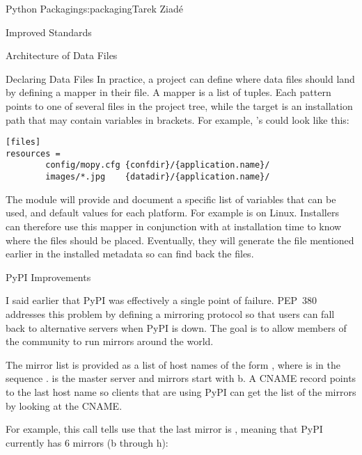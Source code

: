 \begin{aosachapter}{Python Packaging}{s:packaging}{Tarek Ziad\'{e}}
\begin{aosasect1}{Improved Standards}
\begin{aosasect2}{Architecture of Data Files}
\begin{aosasect3}{Declaring Data Files}
In practice, a project can define where data files should land by
defining a mapper in their  file.  A mapper is a
list of  tuples. Each pattern
points to one of several files in the project tree, while the target
is an installation path that may contain variables in brackets.  For
example, 's  could look like this:

\begin{verbatim}
[files]
resources =
        config/mopy.cfg {confdir}/{application.name}/
        images/*.jpg    {datadir}/{application.name}/
\end{verbatim}

\noindent
The  module will provide and document a specific list
of variables that can be used, and default values for each platform.
For example  is  on Linux.  Installers can
therefore use this mapper in conjunction with  at
installation time to know where the files should be placed.
Eventually, they will generate the  file mentioned
earlier in the installed metadata so  can find back the
files.


\end{aosasect3}

\end{aosasect2}

\begin{aosasect2}{PyPI Improvements}

I said earlier that PyPI was effectively a single point of
failure. PEP~380 addresses this problem by defining a mirroring
protocol so that users can fall back to alternative servers when PyPI
is down. The goal is to allow members of the community to run mirrors
around the world.


The mirror list is provided as a list of host names of the form
, where  is in the sequence
.   is the master
server and mirrors start with b. A CNAME record
 points to the last host name so clients
that are using PyPI can get the list of the mirrors by looking at the
CNAME.

For example, this call tells use that the last mirror is
, meaning that PyPI currently has 6 mirrors (b
through h):


\end{aosasect2}
\end{aosasect1}
\end{aosachapter}
